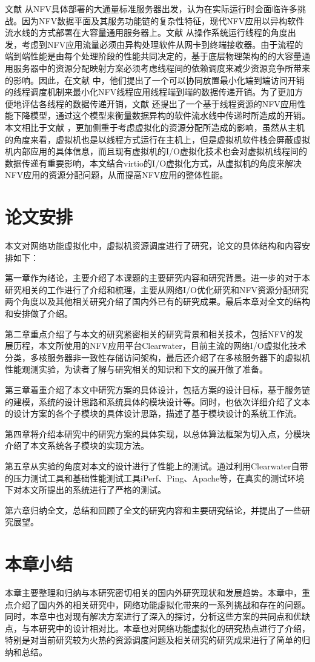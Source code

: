 文献  从NFV具体部署的大通量标准服务器出发，认为在实际运行时会面临许多挑战。因为NFV数据平面及其服务功能链的复杂性特征，现代NFV应用以异构软件流水线的方式部署在大容量通用服务器上。文献  从操作系统运行线程的角度出发，考虑到NFV应用流量必须由异构处理软件从网卡到终端接收器。由于流程的端到端性能是由每个处理阶段的性能共同决定的，基于底层物理架构的的大容量通用服务器中的资源分配映射方案必须考虑线程间的依赖调度来减少资源竞争所带来的影响。因此，在文献  中，他们提出了一个可以协同放置最小化端到端访问开销的线程调度机制来最小化NFV线程应用线程端到端的数据传递开销。为了更加方便地评估各线程的数据传递开销，文献  还提出了一个基于线程资源的NFV应用性能下降模型，通过这个模型来衡量数据异构的软件流水线中传递时所造成的开销。本文相比于文献 ，更加侧重于考虑虚拟化的资源分配所造成的影响，虽然从主机的角度来看，虚拟机也是以线程方式运行在主机上，但是虚拟机软件栈会屏蔽虚拟机内部应用的具体信息，而且现有虚拟机的I/O虚拟化技术也会对虚拟机线程间的数据传递有重要影响，本文结合virtio的I/O虚拟化方式，从虚拟机的角度来解决NFV应用的资源分配问题，从而提高NFV应用的整体性能。

\section{论文安排}
本文对网络功能虚拟化中，虚拟机资源调度进行了研究，论文的具体结构和内容安排如下：

第一章作为绪论，主要介绍了本课题的主要研究内容和研究背景。进一步的对于本研究相关的工作进行了介绍和梳理，主要从网络I/O优化研究和NFV资源分配研究两个角度以及其他相关研究介绍了国内外已有的研究成果。最后本章对全文的结构和安排做了介绍。

第二章重点介绍了与本文的研究紧密相关的研究背景和相关技术，包括NFV的发展历程，本文所使用的NFV应用平台Clearwater，目前主流的网络I/O虚拟化技术分类，多核服务器非一致性存储访问架构，最后还介绍了在多核服务器下的虚拟机性能观测实验，为读者了解与研究相关的知识和下文的展开做了准备。

第三章着重介绍了本文中研究方案的具体设计，包括方案的设计目标，基于服务链的建模，系统的设计思路和系统具体的模块设计等。同时，也依次详细介绍了文本的设计方案的各个子模块的具体设计思路，描述了基于模块设计的系统工作流。

第四章将介绍本研究中的研究方案的具体实现，以总体算法框架为切入点，分模块介绍了本文系统各子模块的实现方法。

第五章从实验的角度对本文的设计进行了性能上的测试。通过利用Clearwater自带的压力测试工具和基础性能测试工具iPerf、Ping、Apache等，在真实的测试环境下对本文所提出的系统进行了严格的测试。

第六章归纳全文，总结和回顾了全文的研究内容和主要研究结论，并提出了一些研究展望。

\section{本章小结}
本章主要整理和归纳与本研究密切相关的国内外研究现状和发展趋势。本章中，重点介绍了国内外的相关研究中，网络功能虚拟化带来的一系列挑战和存在的问题。同时，本章中也对现有解决方案进行了深入的探讨，分析这些方案的共同点和优缺点，与本研究中的设计相对比。本章也对网络功能虚拟化的研究热点进行了介绍，特别是对当前研究较为火热的资源调度问题及相关研究的研究成果进行了简单的归纳和总结。